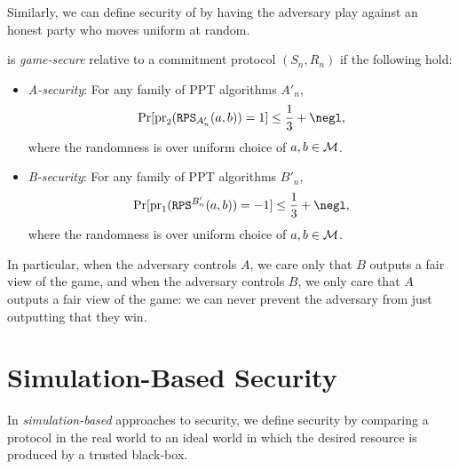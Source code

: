 \noindent
Similarly, we can define security of  by having
the adversary play against an honest party who moves uniform at random.

\begin{dfn}
	 is \emph{game-secure} relative to a commitment
	protocol $(S_n,R_n)$ if the following hold:
	\begin{itemize}
		\item \emph{A-security}: For any family of PPT algorithms $A'_n$,\[
			      \Pr[\pr_2(\alg{RPS}_{A'_n}(a,b)) = 1] \leq \frac{1}{3} + \negl,
		      \]
		      where the randomness is over uniform choice of $a,b\in\mathcal{M}$.
		\item \emph{B-security}: For any family of PPT algorithms $B'_n$,\[
			      \Pr[\pr_1(\alg{RPS}^{B'_n}(a,b)) = -1] \leq \frac{1}{3} + \negl,
		      \]
		      where the randomness is over uniform choice of $a,b\in\mathcal{M}$.
	\end{itemize}
\end{dfn}

\noindent
In particular, when the adversary controls $A$, we care only that $B$ outputs a
fair view of the game, and when the adversary controls $B$, we only care that
$A$ outputs a fair view of the game: we can never prevent the adversary from
just outputting that they win.

\section{Simulation-Based Security}

In \emph{simulation-based} approaches to security, we define security by
comparing a protocol in the real world to an ideal world in which the desired
resource is produced by a trusted black-box.
